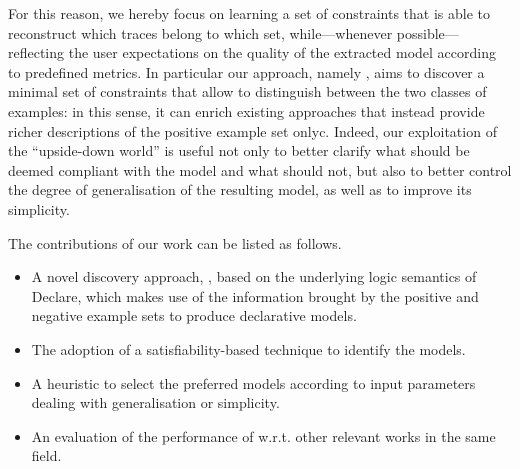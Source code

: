 
For this reason, we hereby focus on learning a set of constraints that is able to reconstruct which traces belong to which set, while---whenever possible---reflecting the user expectations on the quality of the extracted model according to predefined metrics. 
%
In particular our approach, namely \nd, aims to discover a minimal set of constraints that allow to distinguish between the two classes of examples: in this sense, it can enrich existing approaches that instead provide richer descriptions of the positive example set onlyc. Indeed, our exploitation of the ``upside-down world'' is useful not only to better clarify what should be deemed compliant with the model and what should not, but also to better control the degree of generalisation of the resulting model, as well as to improve its simplicity.

%



The contributions of our work can be listed as follows.
\begin{itemize}
\item A novel discovery approach, \nd, based on the underlying logic semantics of Declare, which makes use of the information brought by the positive and negative example sets to produce declarative models.
\item The adoption of a satisfiability-based technique to identify the models.
\item A heuristic to select the preferred models according to input parameters dealing with generalisation or simplicity.
\item An evaluation of the performance of \nd w.r.t. other relevant works in the same field.
\end{itemize}

